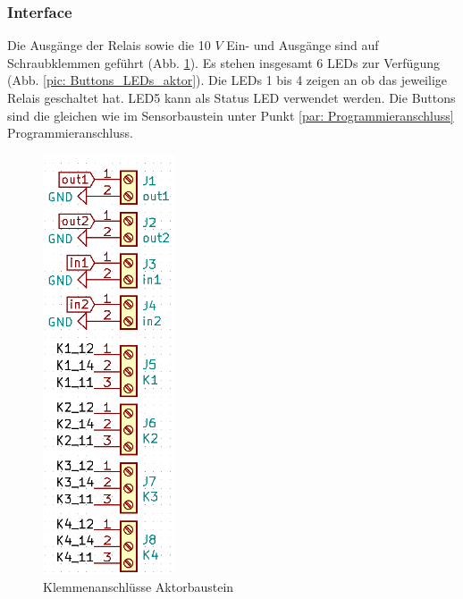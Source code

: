 \subsubsection{Interface}
Die Ausgänge der Relais sowie die 10 $V$ Ein- und Ausgänge sind auf Schraubklemmen geführt (Abb. \ref{pic: Klemmen_aktor}). Es stehen insgesamt 6 LEDs zur Verfügung (Abb. \ref{pic: Buttons_LEDs_aktor}). Die LEDs 1 bis 4 zeigen an ob das jeweilige Relais geschaltet hat. LED5 kann als Status LED verwendet werden. Die Buttons sind die gleichen wie im Sensorbaustein unter Punkt \ref{par: Programmieranschluss} Programmieranschluss.
\begin{figure}[htb]
	\centering
	\begin{minipage}[t]{0.45\linewidth}
	\centering
	\includegraphics[width=0.35\textwidth]{graphics/shematics_aktor_klemmen.png}
	\caption{Klemmenanschlüsse Aktorbaustein}
	\label{pic: Klemmen_aktor}
	\end{minipage}%
	\hfill
	\begin{minipage}[t]{0.45\linewidth}
	\centering

\end{minipage}
\end{figure}
